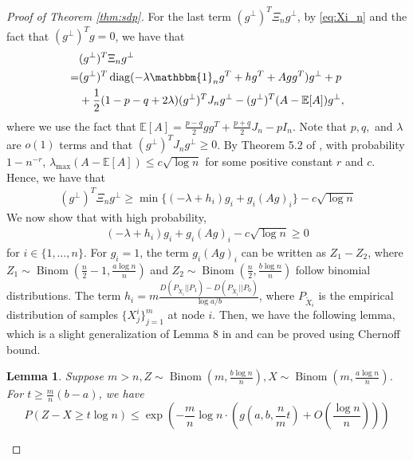 \documentclass[conference]{IEEEtran}
\newtheorem{lemma}{Lemma}
\DeclareMathOperator{\diag}{diag}
\DeclareMathOperator{\Binom}{Binom}
\begin{document}
\begin{proof}[Proof of Theorem \ref{thm:sdp}]
 
	
	
	
	
	
	
	For the last term $(g^{\perp})^T \Xi_n g^{\perp}$, by \eqref{eq:Xi_n} and the fact that $(g^{\perp})^Tg=0$, we have that
	\begin{align*}
		&(g^{\perp})^T \Xi_n g^{\perp} \\
		=& (g^{\perp})^T \diag( -\lambda \mathbbm{1}_ng^T+hg^T + Agg^T) g^{\perp} + p \\
		&+ \frac{1}{2}(1-p-q+2\lambda)(g^{\perp})^TJ_n g^{\perp}
		-(g^{\perp})^T(A-\mathbb{E}[A])g^{\perp},
	\end{align*}
	where we use the fact that $\mathbb{E}[A] = \frac{p-q}{2}gg^T + \frac{p+q}{2}J_n - pI_n$. Note that $p,q,$ and $\lambda$ are $o(1)$ terms and that $(g^{\perp})^TJ_n g^{\perp}\ge 0$. 
	By Theorem 5.2 of \cite{lei2015consistency},
	with probability $1-n^{-r}$, $\lambda_{\max}(A-\mathbb{E}[A]) \leq c\sqrt{\log n}$ for some positive constant $r$ and $c$. Hence, we have that
	\begin{align}\label{eq:lastterm}
		(g^{\perp})^T \Xi_n g^{\perp} \geq \min\{(-\lambda + h_i) g_i + g_i (Ag)_i \} - c \sqrt{\log n}
	\end{align}
	We now show that with high probability,
	\begin{align}\label{eq:nodei}
		(-\lambda + h_i) g_i + g_i (Ag)_i  - c \sqrt{\log n}\ge 0
	\end{align}
	for $i\in\{1,\ldots,n\}$. For $g_i=1$,
	the term $g_i(Ag)_i$ can be written as 
	$Z_1-Z_2$, where $Z_1\sim \Binom(\frac{n}{2}-1,\frac{a\log n}{n})$
	and $Z_2\sim \Binom(\frac{n}{2},\frac{b\log n}{n})$ 
	follow binomial distributions. The term $h_i=m \frac{D(P_{\widetilde{X}_i} || P_1) - D(P_{\widetilde{X}_i} || P_0) }{\log a /b}$, where $P_{\widetilde{X}_i}$ is the empirical distribution of samples $\{X^i_j\}^m_{j=1}$ at node $i$. Then, we have the following lemma, which is a slight generalization of Lemma 8 in \cite{abbe2015exact} and can be proved using Chernoff bound.
	\begin{lemma}\label{lem:zxt}
		Suppose $m > n, Z \sim \Binom(m, \frac{b\log n}{n}), X\sim \Binom(m, \frac{a\log n}{n})$.
		For $ t \geq \frac{m}{n}(b - a)$, we have
		\begin{equation}\label{eq:estimation}
			P(Z - X \geq t \log n) \leq \exp(-\frac{m}{n}\log n \cdot ( g(a, b, \frac{n}{m}t) + O(\frac{\log n}{n})))

\end{equation}
\end{lemma}
\end{proof}
\end{document}
